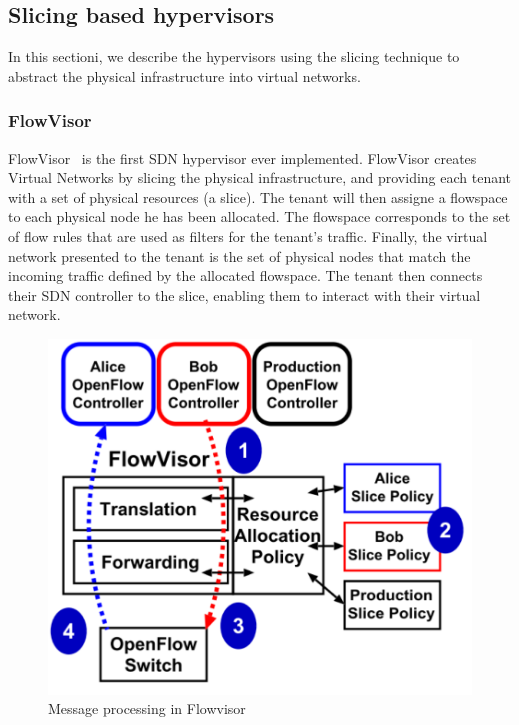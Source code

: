 \subsection{Slicing based hypervisors}
\label{sec:existing-nhv}
In this sectioni, we describe the hypervisors using the slicing technique to abstract the physical infrastructure into virtual networks.

\subsubsection{FlowVisor}

FlowVisor~\cite{FlowVisor-Sherwood2009} is the first SDN hypervisor ever implemented.
FlowVisor creates Virtual Networks by slicing the physical infrastructure, and providing each tenant with a set of physical resources (\ie a slice).
The tenant will then assigne a flowspace to each physical node he has been allocated.
The flowspace corresponds to the set of flow rules that are used as filters for the tenant's traffic.
Finally, the virtual network presented to the tenant is the set of physical nodes that match the incoming traffic defined by the allocated flowspace.
The tenant then connects their SDN controller to the slice, enabling them to interact with their virtual network.



\begin{figure}[ht]
    \centering
    \includegraphics[scale=0.6]{figures/flowvisor-process.pdf}
    \caption{Message processing in Flowvisor~\cite{FlowVisor-Sherwood2009}}
    \label{fig:flowvisor-process}
\end{figure}

